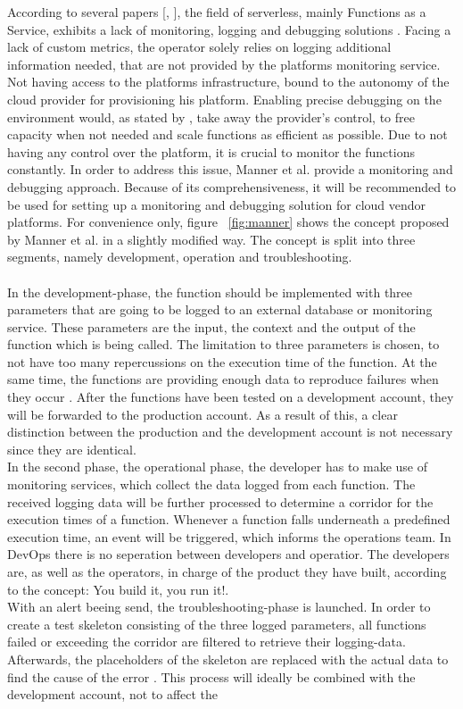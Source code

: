 \documentclass[a4paper,twoside,11pt, pagesize]{scrartcl}
\begin{document}
According to several papers [\cite{roberts2017serverless}, \cite{baldini2017serverless}], the field of serverless, mainly Functions as a Service, exhibits a lack of monitoring, logging and debugging solutions \cite{kritikos2018review}. Facing a lack of custom metrics, the operator solely relies on logging additional information needed, that are not provided by the platforms monitoring service. Not having access to the platforms infrastructure, bound to the autonomy of the cloud provider for provisioning his platform. Enabling precise debugging on the environment would, as stated by \cite{manner2019troubleshooting}, take away the provider's control, to free capacity when not needed and scale functions as efficient as possible. Due to not having any control over the platform, it is crucial to monitor the functions constantly. In order to address this issue, Manner et al. provide a monitoring and debugging approach. Because of its comprehensiveness, it will be recommended to be used for setting up a monitoring and debugging solution for cloud vendor platforms. For convenience only, figure ~\ref{fig:manner} shows the concept proposed by Manner et al. in a slightly modified way. The concept is split into three segments, namely development, operation and troubleshooting.\\\\ In the development-phase, the function should be implemented with three parameters that are going to be logged to an external database or monitoring service. These parameters are the input, the context and the output of the function which is being called. The limitation to three parameters is chosen, to not have too many repercussions on the execution time of the function. At the same time, the functions are providing enough data to reproduce failures when they occur \cite{manner2019troubleshooting}. After the functions have been tested on a development account, they will be forwarded to the production account. As a result of this, a clear distinction between the production and the development account is not necessary since they are identical. \\ In the second phase, the operational phase, the developer has to make use of monitoring services, which collect the data logged from each function. The received logging data will be further processed to determine a corridor for the execution times of a function. Whenever a function falls underneath a predefined execution time, an event will be triggered, which informs the operations team. In DevOps there is no seperation between developers and operatior. The developers are, as well as the operators, in charge of the product they have built, according to the concept: \glqq You build it, you run it!\grqq{}.\\ With an alert beeing send, the troubleshooting-phase is launched. In order to create a test skeleton consisting of the three logged parameters, all functions failed or exceeding the corridor are filtered to retrieve their logging-data. Afterwards, the placeholders of the skeleton are replaced with the actual data to find the cause of the error \cite{manner2019troubleshooting}. This process will ideally be combined with the development account, not to affect the 
\end{document}
